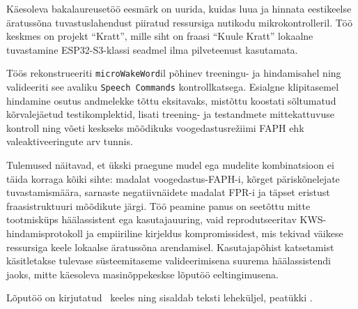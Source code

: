 Käesoleva bakalaureusetöö eesmärk on uurida, kuidas luua ja hinnata eestikeelse äratussõna tuvastuslahendust piiratud ressursiga nutikodu mikrokontrolleril. Töö keskmes on projekt \enquote{Kratt}, mille siht on fraasi \enquote{Kuule Kratt} lokaalne tuvastamine ESP32-S3-klassi seadmel ilma pilveteenust kasutamata.

Töös rekonstrueeriti \texttt{microWakeWord}il põhinev treeningu- ja hindamisahel ning valideeriti see avaliku \texttt{Speech Commands} kontrollkatsega. Esialgne klipitasemel hindamine osutus andmelekke tõttu eksitavaks, mistõttu koostati sõltumatud kõrvalejäetud testikomplektid, lisati treening- ja testandmete mittekattuvuse kontroll ning võeti keskseks mõõdikuks voogedastusrežiimi FAPH ehk valeaktiveeringute arv tunnis.

Tulemused näitavad, et ükski praegune mudel ega mudelite kombinatsioon ei täida korraga kõiki sihte: madalat voogedastus-FAPH-i, kõrget päriskõnelejate tuvastamismäära, sarnaste negatiivnäidete madalat FPR-i ja täpset eristust fraasistruktuuri mõõdikute järgi. Töö peamine panus on seetõttu mitte tootmisküps häälassistent ega kasutajauuring, vaid reprodutseeritav KWS-hindamisprotokoll ja empiiriline kirjeldus kompromissidest, mis tekivad väikese ressursiga keele lokaalse äratussõna arendamisel. Kasutajapõhist katsetamist käsitletakse tulevase süsteemitaseme valideerimisena suurema häälassistendi jaoks, mitte käesoleva masinõppekeskse lõputöö eeltingimusena.

Lõputöö on kirjutatud \langEst~keeles ning sisaldab teksti \calculatepages leheküljel, 
 peatükki%
%
.
